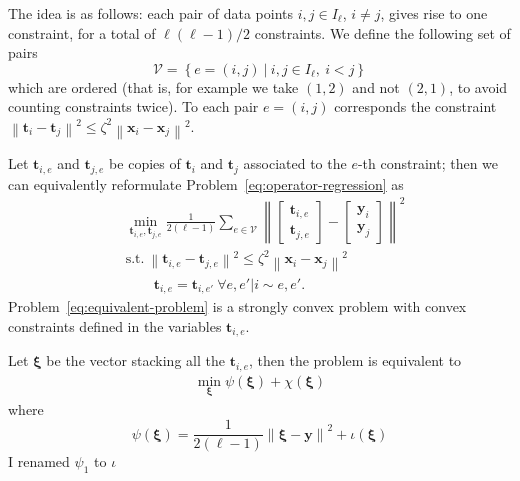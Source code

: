 \documentclass{article}
\newcommand{\norm}[1]{\left\lVert#1\right\rVert}
\newcommand{\tv}{\mathbold{t}}
\newcommand{\x}{\mathbold{x}}
\newcommand{\y}{\mathbold{y}}
\newcommand{\xx}{\pmb{\xi}}
\newcommand{\nicola}[1]{{\color{blue}#1}}
\begin{document}
The idea is as follows: each pair of data points $i, j \in I_{\ell}$, $i \neq j$, gives rise to one constraint, for a total of $\ell(\ell-1)/2$ constraints. We define the following set of pairs
\begin{equation}
	\mathcal{V} = \left\{ e = (i,j) \ | \ i, j \in I_{\ell}, \ i < j \right\}
\end{equation}
which are ordered (that is, for example we take $(1,2)$ and not $(2,1)$, to avoid counting constraints twice). To each pair $e = (i,j)$ corresponds the constraint $\norm{\tv_i - \tv_j}^2 \leq \zeta^2 \norm{\x_i - \x_j}^2$.

Let $\tv_{i,e}$ and $\tv_{j,e}$ be copies of $\tv_i$ and $\tv_j$ associated to the $e$-th constraint; then we can equivalently reformulate Problem~\eqref{eq:operator-regression} as
\begin{subequations}\label{eq:equivalent-problem}
\begin{align}
	&\min_{\tv_{i,e}, \tv_{j,e}} \frac{1}{2 (\ell-1)} \sum_{e \in \mathcal{V}} \norm{\begin{bmatrix} \tv_{i,e} \\ \tv_{j,e} \end{bmatrix} - \begin{bmatrix} \y_i \\ \y_j \end{bmatrix}}^2 \\
	&\text{s.t.} \ \norm{\tv_{i,e} - \tv_{j,e}}^2 \leq \zeta^2 \norm{\x_i - \x_j}^2 \label{eq:interpolation-constraints} \\
	&\qquad \tv_{i,e} = \tv_{i,e'} \ \forall e, e' | i \sim e, e'. \label{eq:consensus-constraints}
\end{align}
\end{subequations}
Problem~\eqref{eq:equivalent-problem} is a strongly convex problem with convex constraints defined in the variables $\tv_{i,e}$.

Let $\xx$ be the vector stacking all the $\tv_{i,e}$, then the problem is equivalent to
\begin{align*}
	\min_{\xx} \psi(\xx) + \chi(\xx)
\end{align*}
where
$$
	\psi(\xx) = \frac{1}{2(\ell-1)} \norm{\xx - \y}^2 + \iota(\xx)
$$
\nicola{I renamed $\psi_1$ to $\iota$}
\end{document}
